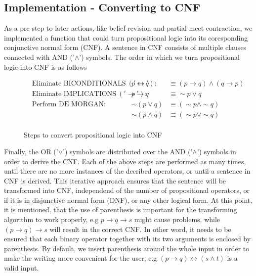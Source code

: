 \documentclass[a4paper,10pt]{article}
\begin{document}
\subsection{Implementation - Converting to CNF}
\label{subsec:implementation_cnf}
As a pre step to later actions, like belief revision and partial meet contraction, we implemented a function that could turn propositional logic into its coresponding conjunctive normal form (CNF). A sentence in CNF consists of multiple clauses connected with AND ('$\wedge$') symbols. The order in which we turn propositional logic into CNF is as follows

\begin{figure}[h]
	\begin{align*}
		&\text{Eliminate BICONDITIONALS}\ ('\leftrightarrow'): & p\leftrightarrow q &\equiv (p\rightarrow q) \wedge (q\rightarrow p) \\
		&\text{Eliminate IMPLICATIONS}\ ('\rightarrow'): & p\rightarrow q &\equiv \sim p\vee q \\
		&\text{Perform DE MORGAN}: & \sim(p\vee q) &\equiv (\sim p\wedge\sim q) \\
		&						   & \sim(p\wedge q) &\equiv (\sim p\vee\sim q) \\					
	\end{align*}
	\caption{Steps to convert propositional logic into CNF}
	\label{fig:cnf_rules}
\end{figure}
 
Finally, the OR ('$\vee$') symbols are distributed over the AND ('$\wedge$') symbols in order to derive the CNF. Each of the above steps are performed as many times, until there are no more instances of the decribed operators, or until a sentence in CNF is derived. This iterative approach ensures that the sentence will be transformed into CNF, independend of the number of propositional operators, or if it is in disjunctive normal form (DNF), or any other logical form.
At this point, it is mentioned, that the use of parenthesis is important for the transforming algorithm to work properly, e.g $p\rightarrow q\rightarrow s$ might cause problems, while $(p\rightarrow q)\rightarrow s$ will result in the correct CNF. In other word, it needs to be ensured that each binary operator together with its two arguments is enclosed by parenthesis. By default, we insert parenthesis around the whole input in order to make the writing more convenient for the user, e.g $(p\rightarrow q)\leftrightarrow (s\wedge t)$ is a valid input.
\end{document}
